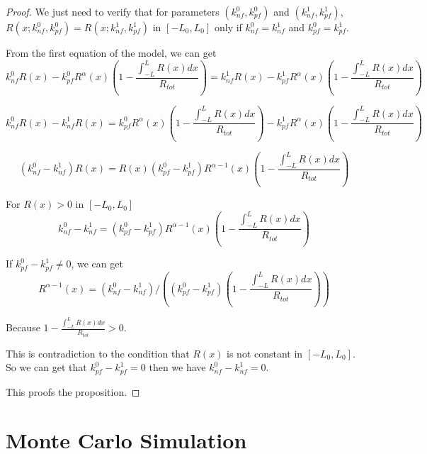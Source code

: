 \documentclass[12pt]{extarticle}
\begin{document}
\begin{proof}
We just need to verify that for parameters $(k_{nf}^{0},k_{pf}^{0})$ and $(k_{nf}^{1},k_{pf}^{1})$, $R(x;k_{nf}^{0},k_{pf}^{0})=R(x;k_{nf}^{1},k_{pf}^{1})$ in $[-L_{0},L_{0}]$ only if $k_{nf}^{0}=k_{nf}^{1}$ and $k_{pf}^{0}=k_{pf}^{1}$.

From the first equation of the model, we can get
\begin{equation*}
k_{nf}^{0}R(x)-k_{pf}^{0}R^{\alpha}(x)\left(1-\frac{\int_{-L}^{L}R(x)dx}{R_{tot}}\right)=k_{nf}^{1}R(x)-k_{pf}^{1}R^{\alpha}(x)\left(1-\frac{\int_{-L}^{L}R(x)dx}{R_{tot}}\right)
\end{equation*}

\begin{equation*}
k_{nf}^{0}R(x)-k_{nf}^{1}R(x)=k_{pf}^{0}R^{\alpha}(x)\left(1-\frac{\int_{-L}^{L}R(x)dx}{R_{tot}}\right)-k_{pf}^{1}R^{\alpha}(x)\left(1-\frac{\int_{-L}^{L}R(x)dx}{R_{tot}}\right)
\end{equation*}

\begin{equation*}
(k_{nf}^{0}-k_{nf}^{1})R(x)=R(x)(k_{pf}^{0}-k_{pf}^{1})R^{\alpha-1}(x)\left(1-\frac{\int_{-L}^{L}R(x)dx}{R_{tot}}\right)
\end{equation*}

For $R(x)>0$ in $[-L_{0},L_{0}]$
\begin{equation*}
k_{nf}^{0}-k_{nf}^{1}=(k_{pf}^{0}-k_{pf}^{1})R^{\alpha-1}(x)\left(1-\frac{\int_{-L}^{L}R(x)dx}{R_{tot}}\right)
\end{equation*}

If $k_{pf}^{0}-k_{pf}^{1}\ne{}0$, we can get
\begin{equation*}
R^{\alpha-1}(x)=(k_{nf}^{0}-k_{nf}^{1})/\left((k_{pf}^{0}-k_{pf}^{1})\left(1-\frac{\int_{-L}^{L}R(x)dx}{R_{tot}}\right)\right)
\end{equation*}

Because $1-\frac{\int_{-L}^{L}R(x)dx}{R_{tot}}>0$.

This is contradiction to the condition that $R(x)$ is not constant in $[-L_{0},L_{0}]$. So we can get that $k_{pf}^{0}-k_{pf}^{1}=0$ then we have $k_{nf}^{0}-k_{nf}^{1}=0$.


This proofs the proposition. 


\end{proof}


\section{Monte Carlo Simulation}
\label{sect:MonteCarloSimulation}
\end{document}
